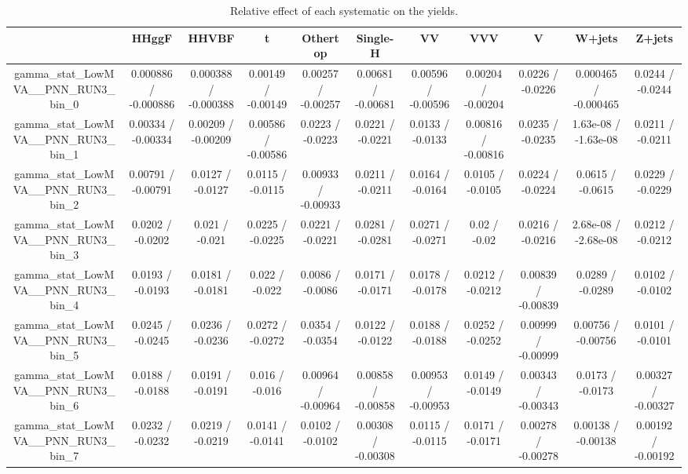 \documentclass[10pt]{article}
\begin{document}
\begin{table}[htbp]
\begin{center}
\begin{tabular}{|c|c|c|c|c|c|c|c|c|c|c|}
\hline 
      & HHggF      & HHVBF      & t      & Othertop      & Single-H      & VV      & VVV      & V      & W+jets      & Z+jets \\ 
\hline 
  gamma_stat_LowMVA__PNN_RUN3_bin_0 & 0.000886 / -0.000886 & 0.000388 / -0.000388 & 0.00149 / -0.00149 & 0.00257 / -0.00257 & 0.00681 / -0.00681 & 0.00596 / -0.00596 & 0.00204 / -0.00204 & 0.0226 / -0.0226 & 0.000465 / -0.000465 & 0.0244 / -0.0244 \\ 
  gamma_stat_LowMVA__PNN_RUN3_bin_1 & 0.00334 / -0.00334 & 0.00209 / -0.00209 & 0.00586 / -0.00586 & 0.0223 / -0.0223 & 0.0221 / -0.0221 & 0.0133 / -0.0133 & 0.00816 / -0.00816 & 0.0235 / -0.0235 & 1.63e-08 / -1.63e-08 & 0.0211 / -0.0211 \\ 
  gamma_stat_LowMVA__PNN_RUN3_bin_2 & 0.00791 / -0.00791 & 0.0127 / -0.0127 & 0.0115 / -0.0115 & 0.00933 / -0.00933 & 0.0211 / -0.0211 & 0.0164 / -0.0164 & 0.0105 / -0.0105 & 0.0224 / -0.0224 & 0.0615 / -0.0615 & 0.0229 / -0.0229 \\ 
  gamma_stat_LowMVA__PNN_RUN3_bin_3 & 0.0202 / -0.0202 & 0.021 / -0.021 & 0.0225 / -0.0225 & 0.0221 / -0.0221 & 0.0281 / -0.0281 & 0.0271 / -0.0271 & 0.02 / -0.02 & 0.0216 / -0.0216 & 2.68e-08 / -2.68e-08 & 0.0212 / -0.0212 \\ 
  gamma_stat_LowMVA__PNN_RUN3_bin_4 & 0.0193 / -0.0193 & 0.0181 / -0.0181 & 0.022 / -0.022 & 0.0086 / -0.0086 & 0.0171 / -0.0171 & 0.0178 / -0.0178 & 0.0212 / -0.0212 & 0.00839 / -0.00839 & 0.0289 / -0.0289 & 0.0102 / -0.0102 \\ 
  gamma_stat_LowMVA__PNN_RUN3_bin_5 & 0.0245 / -0.0245 & 0.0236 / -0.0236 & 0.0272 / -0.0272 & 0.0354 / -0.0354 & 0.0122 / -0.0122 & 0.0188 / -0.0188 & 0.0252 / -0.0252 & 0.00999 / -0.00999 & 0.00756 / -0.00756 & 0.0101 / -0.0101 \\ 
  gamma_stat_LowMVA__PNN_RUN3_bin_6 & 0.0188 / -0.0188 & 0.0191 / -0.0191 & 0.016 / -0.016 & 0.00964 / -0.00964 & 0.00858 / -0.00858 & 0.00953 / -0.00953 & 0.0149 / -0.0149 & 0.00343 / -0.00343 & 0.0173 / -0.0173 & 0.00327 / -0.00327 \\ 
  gamma_stat_LowMVA__PNN_RUN3_bin_7 & 0.0232 / -0.0232 & 0.0219 / -0.0219 & 0.0141 / -0.0141 & 0.0102 / -0.0102 & 0.00308 / -0.00308 & 0.0115 / -0.0115 & 0.0171 / -0.0171 & 0.00278 / -0.00278 & 0.00138 / -0.00138 & 0.00192 / -0.00192 \\ 
\hline 
\end{tabular} 
\caption{Relative effect of each systematic on the yields.} 
\end{center} 
\end{table} 
\end{document}
